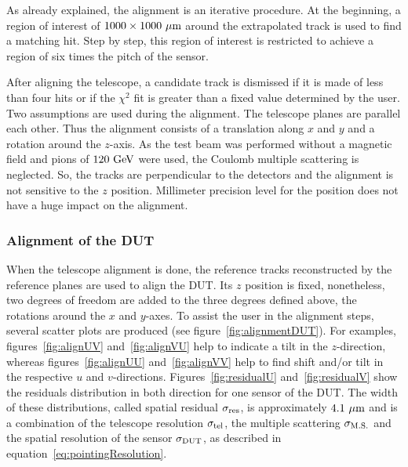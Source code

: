       As already explained, the alignment is an iterative procedure.
      At the beginning, a region of interest of $1000 \times 1000~\rm{\mu m}$ around the extrapolated track is used to find a matching hit.
      Step by step, this region of interest is restricted to achieve a region of six times the pitch of the sensor.
      
      After aligning the telescope, a candidate track is dismissed if it is made of less than four hits or if the $\chi^2$ fit is greater than a fixed value determined by the user. 
      Two assumptions are used during the alignment. 
      The telescope planes are parallel each other.
      Thus the alignment consists of a translation along $x$ and $y$ and a rotation around the $z$-axis.
      As the test beam was performed without a magnetic field and pions of $120~\rm{GeV}$ were used, the Coulomb multiple scattering is neglected.
      So, the tracks are perpendicular to the detectors and the alignment is not sensitive to the $z$ position.
      Millimeter precision level for the position does not have a huge impact on the alignment.

      \subsubsection{Alignment of the DUT}

      When the telescope alignment is done, the reference tracks reconstructed by the reference planes are used to align the \gls{DUT}.
      Its $z$ position is fixed, nonetheless, two degrees of freedom are added to the three degrees defined above, the rotations around the $x$ and $y$-axes.
      To assist the user in the alignment steps, several scatter plots are produced (see figure~\ref{fig:alignmentDUT}).
      For examples, figures~\ref{fig:alignUV} and~\ref{fig:alignVU} help to indicate a tilt in the $z$-direction, whereas figures~\ref{fig:alignUU} and~\ref{fig:alignVV} help to find shift and/or tilt in the respective $u$ and $v$-directions.
      Figures~\ref{fig:residualU} and~\ref{fig:residualV} show the residuals distribution in both direction for one sensor of the \gls{DUT}.
      The width of these distributions, called spatial residual $\sigma_{\rm{res}}$, is approximately $4.1~\rm{\mu m}$ and is a combination of the telescope resolution $\sigma_{\rm{tel}}$, the multiple scattering $\sigma_{\rm{M.S.}}$ and the spatial resolution of the sensor $\sigma_{\rm{DUT}}$, as described in equation~\ref{eq:pointingResolution}.
      
